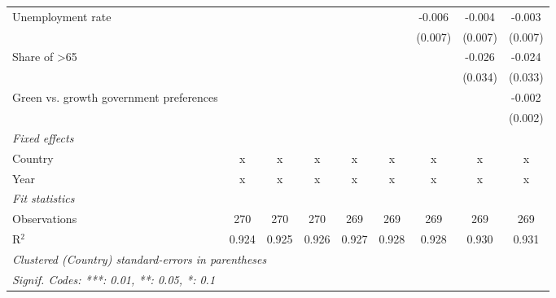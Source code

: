 \begin{table}[htbp]
\begin{tabular}{lcccccccc}
      Unemployment rate                                      &         &         &             &             &         & -0.006      & -0.004  & -0.003\\   
                                                             &         &         &             &             &         & (0.007)     & (0.007) & (0.007)\\   
      Share of >65                                           &         &         &             &             &         &             & -0.026  & -0.024\\   
                                                             &         &         &             &             &         &             & (0.034) & (0.033)\\   
      Green vs. growth government preferences                &         &         &             &             &         &             &         & -0.002\\   
                                                             &         &         &             &             &         &             &         & (0.002)\\   
      \emph{Fixed effects}\\
      Country                                                & x       & x       & x           & x           & x       & x           & x       & x\\  
      Year                                                   & x       & x       & x           & x           & x       & x           & x       & x\\  
      \midrule \emph{Fit statistics}\\
      Observations                                           & 270     & 270     & 270         & 269         & 269     & 269         & 269     & 269\\  
      R$^2$                                                  & 0.924   & 0.925   & 0.926       & 0.927       & 0.928   & 0.928       & 0.930   & 0.931\\  
      \midrule
      \multicolumn{9}{l}{\emph{Clustered (Country) standard-errors in parentheses}}\\
      \multicolumn{9}{l}{\emph{Signif. Codes: ***: 0.01, **: 0.05, *: 0.1}}\\
   \end{tabular}
\end{table}


